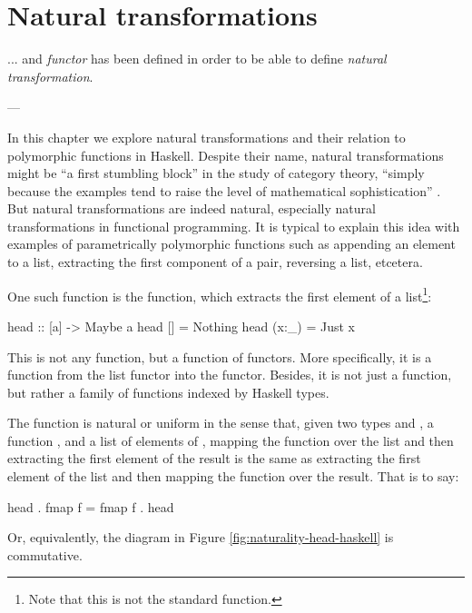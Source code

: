 \chapter{Natural transformations}
\label{chap:naturals}

\epigraph{
  ... and \emph{functor} has been defined in order to be able to
  define \emph{natural transformation}.
}{---\textcite[18]{maclane-1998}}

In this chapter we explore natural transformations and their relation
to polymorphic functions in Haskell. Despite their name, natural
transformations might be ``a first stumbling block'' in the study of
category theory, ``simply because the examples tend to raise the level
of mathematical sophistication'' \parencites[433]{poigne-1992}. But
natural transformations are indeed natural, especially natural
transformations in functional programming. It is typical to explain
this idea with examples of parametrically polymorphic functions such
as appending an element to a list, extracting the first component of a
pair, reversing a list, etcetera.

One such function is the  function, which extracts
the first element of a list\footnote{Note that this is not the
  standard  function.}:
\begin{codehaskell}
head :: [a] -> Maybe a
head []    = Nothing
head (x:_) = Just x
\end{codehaskell}
This is not any function, but a function of functors. More
specifically, it is a function from the list functor into the
 functor. Besides, it is not just a function, but
rather a family of functions indexed by Haskell types.

The  function is natural or uniform in the sense
that, given two types  and , a function
, and a list of elements of ,
mapping the function over the list and then extracting the first
element of the result is the same as extracting the first element of
the list and then mapping the function over the result. That is to
say:
\begin{codehaskell}
head . fmap f = fmap f . head
\end{codehaskell}
Or, equivalently, the diagram in Figure
\ref{fig:naturality-head-haskell} is commutative.

